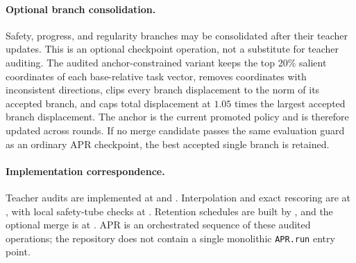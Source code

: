 \paragraph{Optional branch consolidation.}
Safety, progress, and regularity branches may be consolidated after their
teacher updates.  This is an optional checkpoint operation, not a substitute
for teacher auditing.  The audited anchor-constrained variant keeps the top
20\% salient coordinates of each base-relative task vector, removes
coordinates with inconsistent directions, clips every branch displacement to
the norm of its accepted branch, and caps total displacement at $1.05$ times
the largest accepted branch displacement.  The anchor is the current promoted
policy and is therefore updated across rounds.  If no merge candidate passes
the same evaluation guard as an ordinary APR checkpoint, the best accepted
single branch is retained.

\paragraph{Implementation correspondence.}
Teacher audits are implemented at
and .
Interpolation and exact rescoring are at
,
with local safety-tube checks at
.
Retention schedules are built by
,
and the optional merge is at
.
APR is an orchestrated sequence of these audited operations; the repository
does not contain a single monolithic \texttt{APR.run} entry point.
